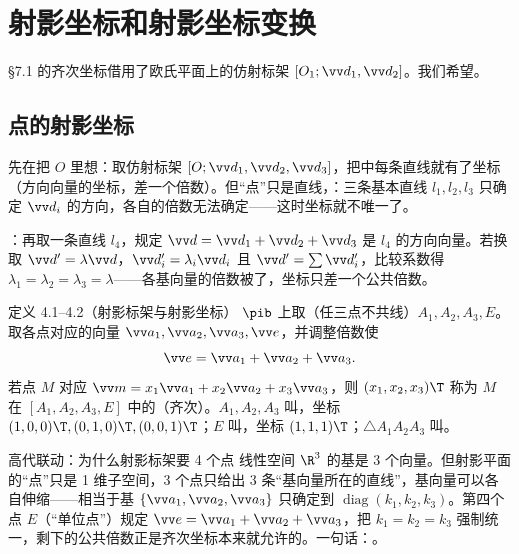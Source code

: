 \section{射影坐标和射影坐标变换}

\S7.1 的齐次坐标借用了欧氏平面上的仿射标架 $[O_1;\vv d_1,\vv d_2]$。我们希望。

\subsection{点的射影坐标}

先在把 $O$ 里想：取仿射标架 $[O;\vv d_1,\vv d_2,\vv d_3]$，把中每条直线就有了坐标（方向向量的坐标，差一个倍数）。但“点”只是直线，：三条基本直线 $l_1,l_2,l_3$ 只确定 $\vv d_i$ 的方向，各自的倍数无法确定——这时坐标就不唯一了。

：再取一条直线 $l_4$，规定 $\vv d=\vv d_1+\vv d_2+\vv d_3$ 是 $l_4$ 的方向向量。若换取 $\vv d'=\lambda\vv d$，$\vv d_i'=\lambda_i\vv d_i$ 且 $\vv d'=\sum\vv d_i'$，比较系数得 $\lambda_1=\lambda_2=\lambda_3=\lambda$——各基向量的倍数被了，坐标只差一个公共倍数。

\begin{defbox}{定义 4.1–4.2（射影标架与射影坐标）}
$\pib$ 上取（任三点不共线）$A_1,A_2,A_3,E$。取各点对应的向量 $\vv a_1,\vv a_2,\vv a_3,\vv e$，并调整倍数使
\[
\vv e=\vv a_1+\vv a_2+\vv a_3 .
\]
若点 $M$ 对应 $\vv m=x_1\vv a_1+x_2\vv a_2+x_3\vv a_3$，则 $(x_1,x_2,x_3)\T$ 称为 $M$ 在 $[A_1,A_2,A_3,E]$ 中的（齐次）。$A_1,A_2,A_3$ 叫，坐标 $(1,0,0)\T,(0,1,0)\T,(0,0,1)\T$；$E$ 叫，坐标 $(1,1,1)\T$；$\triangle A_1A_2A_3$ 叫。
\end{defbox}

\begin{gdbox}{高代联动：为什么射影标架要 4 个点}
线性空间 $\R^3$ 的基是 3 个向量。但射影平面的“点”只是 1 维子空间，3 个点只给出 3 条“基向量所在的直线”，基向量可以各自伸缩——相当于基 $\{\vv a_1,\vv a_2,\vv a_3\}$ 只确定到 $\operatorname{diag}(k_1,k_2,k_3)$。第四个点 $E$（“单位点”）规定 $\vv e=\vv a_1+\vv a_2+\vv a_3$，把 $k_1=k_2=k_3$ 强制统一，剩下的公共倍数正是齐次坐标本来就允许的。一句话：。
\end{gdbox}

